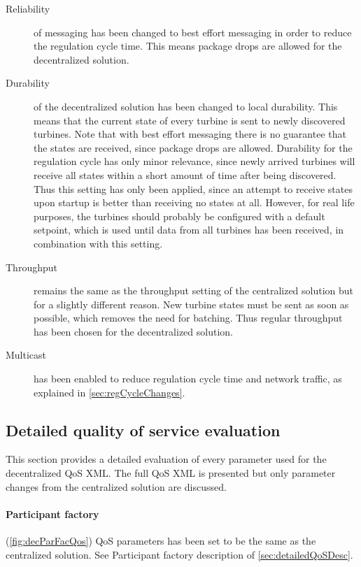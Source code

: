 \begin{description}
	\item[Reliability] of messaging has been changed to best effort messaging in order to reduce the regulation cycle time. This means package drops are allowed for the decentralized solution.
	\item[Durability] of the decentralized solution has been changed to local durability. This means that the current state of every turbine is sent to newly discovered turbines. Note that with best effort messaging there is no guarantee that the states are received, since package drops are allowed. Durability for the regulation cycle has only minor relevance, since newly arrived turbines will receive all states within a short amount of time after being discovered. Thus this setting has only been applied, since an attempt to receive states upon startup is better than receiving no states at all. However, for real life purposes, the turbines should probably be configured with a default setpoint, which is used until data from all turbines has been received, in combination with this setting. 
	\item[Throughput] remains the same as the throughput setting of the centralized solution but for a slightly different reason. New turbine states must be sent as soon as possible, which removes the need for batching.  Thus regular throughput has been chosen for the decentralized solution. 
	\item[Multicast] has been enabled to reduce regulation cycle time and network traffic, as explained in \cref{sec:regCycleChanges}.
\end{description}

\subsection{Detailed quality of service evaluation}

This section provides a detailed evaluation of every parameter used for the decentralized QoS XML. The full QoS XML is presented but only parameter changes from the centralized solution are discussed.

\paragraph{Participant factory} (\cref{fig:decParFacQos}) QoS parameters has been set to be the same as the centralized solution. See Participant factory description of \cref{sec:detailedQoSDesc}.

